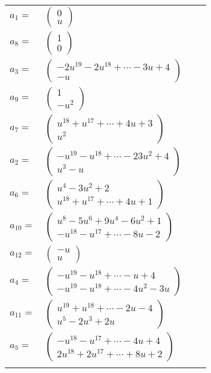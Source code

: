 \documentclass[1p]{elsarticle_modified}
\theoremstyle{definition}
\begin{document}
\begin{tabular}{m{7pt} m{180pt} m{7pt} m{180pt} }
\flushright $a_{1}=$&$\begin{pmatrix}0\\u\end{pmatrix}$ \\
\flushright $a_{8}=$&$\begin{pmatrix}1\\0\end{pmatrix}$ \\
\flushright $a_{3}=$&$\begin{pmatrix}-2 u^{19}-2 u^{18}+\cdots-3 u+4\\- u\end{pmatrix}$ \\
\flushright $a_{9}=$&$\begin{pmatrix}1\\- u^2\end{pmatrix}$ \\
\flushright $a_{7}=$&$\begin{pmatrix}u^{18}+u^{17}+\cdots+4 u+3\\u^2\end{pmatrix}$ \\
\flushright $a_{2}=$&$\begin{pmatrix}- u^{19}- u^{18}+\cdots-23 u^2+4\\u^3- u\end{pmatrix}$ \\
\flushright $a_{6}=$&$\begin{pmatrix}u^4-3 u^2+2\\u^{18}+u^{17}+\cdots+4 u+1\end{pmatrix}$ \\
\flushright $a_{10}=$&$\begin{pmatrix}u^8-5 u^6+9 u^4-6 u^2+1\\- u^{18}- u^{17}+\cdots-8 u-2\end{pmatrix}$ \\
\flushright $a_{12}=$&$\begin{pmatrix}- u\\u\end{pmatrix}$ \\
\flushright $a_{4}=$&$\begin{pmatrix}- u^{19}- u^{18}+\cdots- u+4\\- u^{19}- u^{18}+\cdots-4 u^2-3 u\end{pmatrix}$ \\
\flushright $a_{11}=$&$\begin{pmatrix}u^{19}+u^{18}+\cdots-2 u-4\\u^5-2 u^3+2 u\end{pmatrix}$ \\
\flushright $a_{5}=$&$\begin{pmatrix}- u^{18}- u^{17}+\cdots-4 u+4\\2 u^{18}+2 u^{17}+\cdots+8 u+2\end{pmatrix}$\\&\end{tabular}
\end{document}
